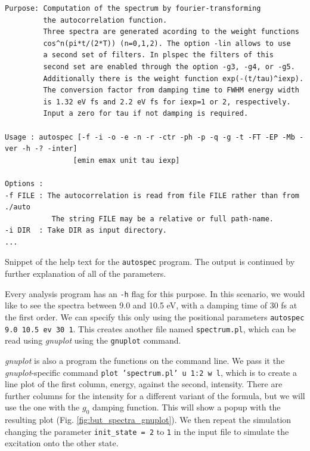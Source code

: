 \documentclass[12pt]{article}
\newenvironment{code}{\captionsetup{type=listing}}{\par\addvspace{\baselineskip}}
\begin{document}
\begin{code}\begin{verbatim}
Purpose: Computation of the spectrum by fourier-transforming
         the autocorrelation function.
         Three spectra are generated acording to the weight functions
         cos^n(pi*t/(2*T)) (n=0,1,2). The option -lin allows to use
         a second set of filters. In plspec the filters of this
         second set are enabled through the option -g3, -g4, or -g5.
         Additionally there is the weight function exp(-(t/tau)^iexp).
         The conversion factor from damping time to FWHM energy width
         is 1.32 eV fs and 2.2 eV fs for iexp=1 or 2, respectively.
         Input a zero for tau if not damping is required.

Usage : autospec [-f -i -o -e -n -r -ctr -ph -p -q -g -t -FT -EP -Mb -ver -h -? -inter] 
                [emin emax unit tau iexp]

Options : 
-f FILE : The autocorrelation is read from file FILE rather than from ./auto
           The string FILE may be a relative or full path-name.
-i DIR  : Take DIR as input directory.
...
\end{verbatim}
\caption{Snippet of the help text for the \texttt{autospec} program. The output is continued by further explanation of all of the parameters.}
\label{lst:autospec_help}
\end{code}

Every analysis program has an \texttt{-h} flag for this purpose. In this scenario, we would like to see the spectra between 9.0 and 10.5 eV, with a damping time of 30 fs at the first order. We can specify this only using the positional parameters \texttt{autospec 9.0 10.5 ev 30 1}. This creates another file named \texttt{spectrum.pl}, which can be read using \textit{gnuplot} using the \texttt{gnuplot} command. 

\textit{gnuplot} is also a program the functions on the command line. We pass it the \textit{gnuplot}-specific command \texttt{plot 'spectrum.pl' u 1:2 w l}, which is to create a line plot of the first column, energy, against the second, intensity. There are further columns for the intensity for a different variant of the formula, but we will use the one with the \(g_0\) damping function. This will show a popup with the resulting plot (Fig. \ref{fig:but_spectra_gnuplot}). We then repeat the simulation changing the parameter \texttt{init\_state = 2} to \texttt{1} in the input file to simulate the excitation onto the other state.
\end{document}
